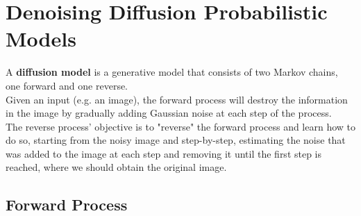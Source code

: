 \documentclass{article}
\begin{document}
\newpage
\section{Denoising Diffusion Probabilistic Models}

A \textbf{diffusion model} is a generative model that consists of two Markov chains, one forward and one reverse. \\
Given an input (e.g. an image), the forward process will destroy the information in the image by gradually adding Gaussian noise at each step of the process. \cite{ho2020denoising} \\
The reverse process' objective is to "reverse" the forward process and learn how to do so, starting from the noisy image and step-by-step, estimating the noise that was added to the image at each step and removing it until the first step is reached, where we should obtain the original image. \cite{ho2020denoising} \\

\subsection{Forward Process}
\end{document}
